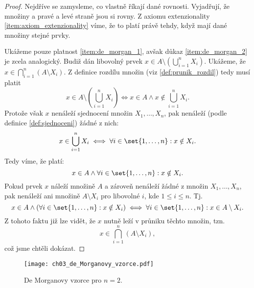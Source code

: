 \begin{proof}
    Nejdříve se zamysleme, co vlastně říkají dané rovnosti. Vyjadřují, že množiny a pravé a levé straně jsou si rovny. Z axiomu extenzionality \ref{item:axiom_extenzionality} víme, že to platí právě tehdy, když mají dané množiny stejné prvky.\par
    Ukážeme pouze platnost \ref{item:de_morgan_1}, avšak důkaz \ref{item:de_morgan_2} je zcela analogický. Budiž dán libovolný prvek $x\in A \setminus \left(\bigcup_{i=1}^{n}{X_i}\right)$. Ukážeme, že $x\in\bigcap_{i=1}^{n}{(A \setminus X_i)}$. Z definice rozdílu množin (viz \ref{def:prunik_rozdil}) tedy musí platit
    \begin{equation*}
        x\in A \setminus \left(\bigcup\limits_{i=1}^{n}{X_i}\right)\iff x\in A \land x\notin \bigcup\limits_{i=1}^{n}{X_i}.
    \end{equation*}
    Protože však $x$ nenáleží sjednocení množin $X_1,\dots,X_n$, pak nenáleží (podle definice \ref{def:sjednoceni}) žádné z nich:
    \begin{equation*}
        x\in\bigcup\limits_{i=1}^{n}{X_i}\iff\forall i\in\set{1,\dots,n}: x\notin X_i.
    \end{equation*}
    Tedy víme, že platí:
    \begin{equation*}
        x\in A \land \forall i\in\set{1,\dots,n}: x\notin X_i.
    \end{equation*}
    Pokud prvek $x$ náleží množině $A$ a zároveň nenáleží žádné z množin $X_1,\dots,X_n$, pak nenáleží ani množině $A\setminus X_i$ pro libovolné $i$, kde $1\leq i\leq n$. Tj.
    \begin{equation*}
        x\in A \land (\forall i\in\set{1,\dots,n}: x\notin X_i)\iff \forall i\in\set{1,\dots,n}: x\in A\setminus X_i.
    \end{equation*}
    Z tohoto faktu již lze vidět, že $x$ nutně leží v průniku těchto množin, tzn.
    \begin{equation*}
        x\in\bigcap\limits_{i=1}^{n}{(A \setminus X_i)},
    \end{equation*} 
    což jsme chtěli dokázat.
\end{proof}
\begin{figure}[H]
	\centering
	\texttt{[image: ch03\_de\_Morganovy\_vzorce.pdf]}
    \caption{De Morganovy vzorce pro $n=2$.}
    \label{fig:de_morgan}
\end{figure}

